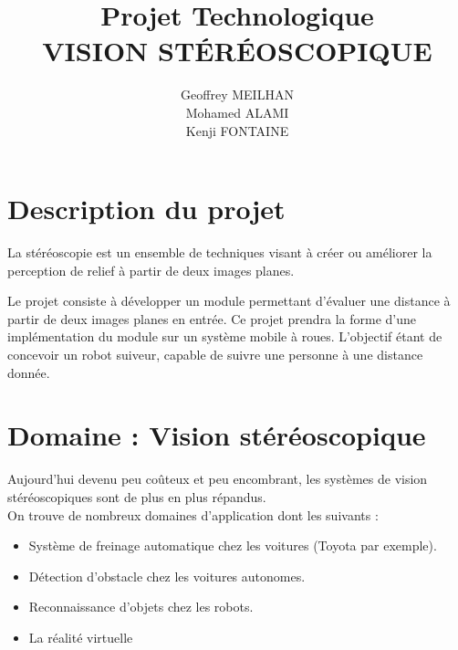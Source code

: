 \documentclass[a4paper]{article}
\title
{
	\LARGE{Projet Technologique}
	\HRule \\ [0.5cm]
	\LARGE \textbf{\uppercase{Vision Stéréoscopique}}
	\HRule \\ [0.5cm]
}
\author{Geoffrey MEILHAN \\ Mohamed ALAMI \\ Kenji FONTAINE}
\begin{document}
\null  %
\nointerlineskip  %
\vfill
\let\snewpage \newpage
\let\newpage \relax
\maketitle
\let \newpage \snewpage
\vfill
\break %


\tableofcontents
\newpage


\section{Description du projet}
La stéréoscopie est un ensemble de techniques visant à créer ou améliorer la
perception de relief à partir de deux images planes.

Le projet consiste à développer un module permettant d'évaluer une distance à
partir de deux images planes en entrée. Ce projet prendra la forme d'une implémentation
du module sur un système mobile à roues. L'objectif étant de concevoir un robot
suiveur, capable de suivre une personne à une distance donnée.


\section{Domaine : Vision stéréoscopique}

Aujourd'hui devenu peu coûteux et peu encombrant, les systèmes de vision
stéréoscopiques sont de plus en plus répandus. \\
On trouve de nombreux domaines d'application dont les suivants :
\begin{itemize}
	\item Système de freinage automatique chez les voitures (Toyota par exemple).
	\item Détection d'obstacle chez les voitures autonomes.
	\item Reconnaissance d'objets chez les robots.
	\item La réalité virtuelle
\end{itemize}
\end{document}
